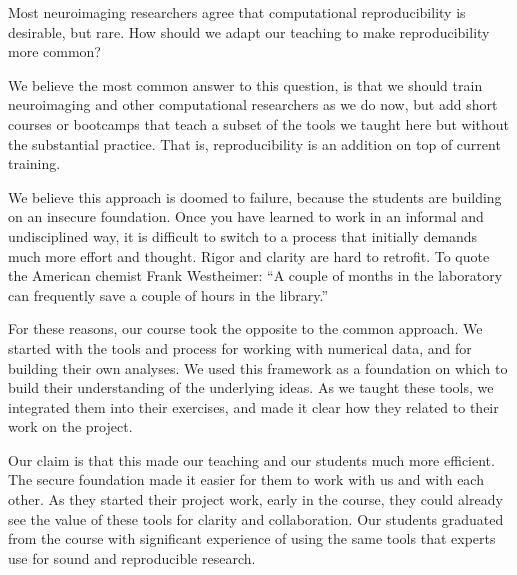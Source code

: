 

Most neuroimaging researchers agree that computational reproducibility is
desirable, but rare.  How should we adapt our teaching to make reproducibility
more common?

We believe the most common answer to this question, is that we should train
neuroimaging and other computational researchers as we do now, but add short
courses or bootcamps that teach a subset of the tools we taught here but without
the substantial practice.
That is, reproducibility is an addition on top of current training.

We believe this approach is doomed to failure, because the students are
building on an insecure foundation.  Once you have learned to work in an
informal and undisciplined way, it is difficult to switch to a process that
initially demands much more effort and thought.  Rigor and clarity are hard to
retrofit.
To quote the American chemist Frank Westheimer:
``A couple of months in the laboratory can frequently save a couple of hours
in the library.''

For these reasons, our course took the opposite to the common approach. We
started with the tools and process for working with numerical data, and for
building their own analyses. We used this framework as a foundation on which
to build their understanding of the underlying ideas.  As we taught these
tools, we integrated them into their exercises, and made it clear how they
related to their work on the project.

Our claim is that this made our teaching and our students much more efficient.
The secure foundation made it easier for them to work with us and with each
other. As they started their project work, early in the course, they could
already see the value of these tools for clarity and collaboration. Our
students graduated from the course with significant experience of using the
same tools that experts use for sound and reproducible research.

